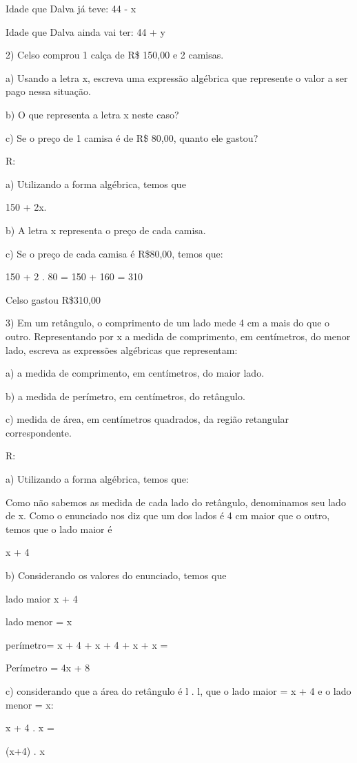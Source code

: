 Idade que Dalva já teve: 44 - x

Idade que Dalva ainda vai ter: 44 + y

2) Celso comprou 1 calça de R\$ 150,00 e 2 camisas.

a) Usando a letra x, escreva uma expressão algébrica que represente o
valor a ser pago nessa situação.

b) O que representa a letra x neste caso?

c) Se o preço de 1 camisa é de R\$ 80,00, quanto ele gastou?

R:

a) Utilizando a forma algébrica, temos que

150 + 2x.

b) A letra x representa o preço de cada camisa.

c) Se o preço de cada camisa é R\$80,00, temos que:

150 + 2 . 80 = 150 + 160 = 310

Celso gastou R\$310,00

3) Em um retângulo, o comprimento de um lado mede 4 cm a mais do que o
outro. Representando por x a medida de comprimento, em centímetros, do
menor lado, escreva as expressões algébricas que representam:

a) a medida de comprimento, em centímetros, do maior lado.

b) a medida de perímetro, em centímetros, do retângulo.

c) medida de área, em centímetros quadrados, da região retangular
correspondente.

R:

a) Utilizando a forma algébrica, temos que:

Como não sabemos as medida de cada lado do retângulo, denominamos seu
lado de x. Como o enunciado nos diz que um dos lados é 4 cm maior que o
outro, temos que o lado maior é

x + 4

b) Considerando os valores do enunciado, temos que

lado maior x + 4

lado menor = x

perímetro= x + 4 + x + 4 + x + x =

Perímetro = 4x + 8

c) considerando que a área do retângulo é l . l, que o lado maior = x +
4 e o lado menor = x:

x + 4 . x =

(x+4) . x

